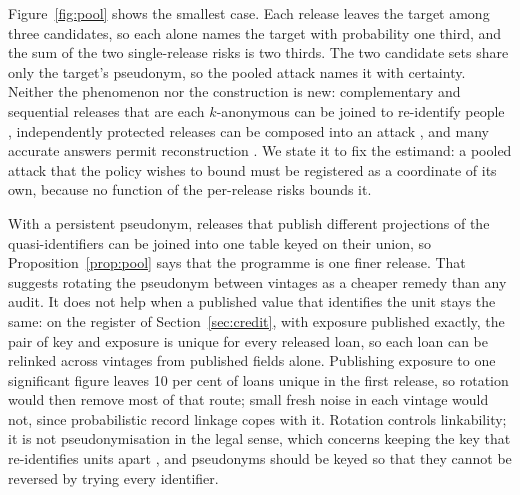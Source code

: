 Figure~\ref{fig:pool} shows the smallest case. Each release leaves the target among three candidates, so each alone names the target with probability one third, and the sum of the two single-release risks is two thirds. The two candidate sets share only the target's pseudonym, so the pooled attack names it with certainty. Neither the phenomenon nor the construction is new: complementary and sequential releases that are each $k$-anonymous can be joined to re-identify people \cite{sweeney2002,wang2006,xiao2007}, independently protected releases can be composed into an attack \cite{ganta2008}, and many accurate answers permit reconstruction \cite{dinur2003}. We state it to fix the estimand: a pooled attack that the policy wishes to bound must be registered as a coordinate of its own, because no function of the per-release risks bounds it.

With a persistent pseudonym, releases that publish different projections of the quasi-identifiers can be joined into one table keyed on their union, so Proposition~\ref{prop:pool} says that the programme is one finer release. That suggests rotating the pseudonym between vintages as a cheaper remedy than any audit. It does not help when a published value that identifies the unit stays the same: on the register of Section~\ref{sec:credit}, with exposure published exactly, the pair of key and exposure is unique for every released loan, so each loan can be relinked across vintages from published fields alone. Publishing exposure to one significant figure leaves 10 per cent of loans unique in the first release, so rotation would then remove most of that route; small fresh noise in each vintage would not, since probabilistic record linkage copes with it. Rotation controls linkability; it is not pseudonymisation in the legal sense, which concerns keeping the key that re-identifies units apart \cite{gdpr2016}, and pseudonyms should be keyed so that they cannot be reversed by trying every identifier.

